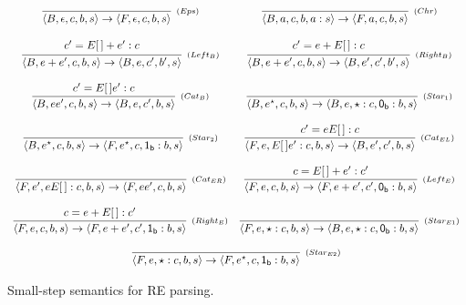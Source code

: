 \documentclass[oneside,12pt]{scrbook}
\theoremstyle{definition}
\newcommand{\C}[1]{\red{\mathsf{#1}}}
\newcommand{\conf}[1]{\ensuremath{\langle #1 \rangle}}
\theoremstyle{plain}
\theoremstyle{definition}
\begin{document}
\begin{figure}[h]
	\[
	\begin{array}{cc}
	\infer[_{(Eps)}]{\conf{B,\epsilon,c,b,s} \to \conf{F,\epsilon,c,b,s}}{}
	&
	\infer[_{(Chr)}]{\conf{B,a,c,b,a:s} \to \conf{F,a,c,b,s}}{}
	
	\\ \\
	\infer[_{(Left_B)}]{\conf{B,e+e',c,b,s}\to\conf{B,e,c',b',s}}
	{\begin{array}{c}
		c' = E[\,]+e' : c \\
		\end{array}}
	&
	\infer[_{(Right_B)}]{\conf{B,e+e',c,b,s}\to\conf{B,e',c',b',s}}
	{\begin{array}{c}
		c' = e + E[\,] : c \\
		\end{array}}
	
	\\ \\
	\infer[_{(Cat_B)}]{\conf{B,ee',c,b,s}\to\conf{B,e,c',b,s}}
	{c' = E[\,]e' : c}
	&
	\infer[_{(Star_1)}]{\conf{B,e^\star,c,b,s}\to\conf{B,e,\star : c, \ensuremath{\C{0_b}} : b, s}}{}
	
	\\ \\
	\infer[_{(Star_2)}]{\conf{B,e^\star,c,b,s}\to\conf{F,e^\star, c, \ensuremath{\C{1_b}} : b, s}}{}
	&
	\infer[_{(Cat_{EL})}]{\conf{F,e,E[\,]e':c,b,s}\to\conf{B,e',c',b,s}}{c'=eE[\,]:c}
	
	\\ \\
	\infer[_{(Cat_{ER})}]{\conf{F,e',eE[\,]:c,b,s}\to\conf{F,ee',c,b,s}}{}
	&
	\infer[_{(Left_E)}]{\conf{F,e,c,b,s}\to\conf{F,e+e',c',\ensuremath{\C{0_b}}:b,s}}{c = E[\,]+e' : c'}
	
	\\ \\
	
	\infer[_{(Right_E)}]{\conf{F,e,c,b,s}\to\conf{F,e+e',c',\ensuremath{\C{1_b}}:b,s}}{c = e + E[\,] : c'}
	&
	\infer[_{(Star_{E1})}]{\conf{F,e,\star:c,b,s}\to\conf{B,e,\star:c,\ensuremath{\C{0_b}}:b,s}}{}
	
	\\ \\
	
	\multicolumn{2}{c}{
		
		\begin{array}{c}
		\infer[_{(Star_{E2})}]{\conf{F,e,\star:c,b,s}\to\conf{F,e^\star,c,\ensuremath{\C{1_b}}:b,s}}{}
		\end{array}
		
	}
	\end{array}
	\]
	\centering
	\caption{Small-step semantics for RE parsing.}
	\label{figure:smallstep}
\end{figure}
\end{document}
